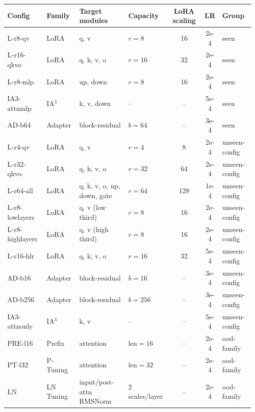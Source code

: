 \begin{table}[t]
\centering
\small
\setlength{\tabcolsep}{4pt}
\begin{tabular}{@{}llllccl@{}}
\toprule
Config & Family & Target modules & Capacity & LoRA scaling & LR & Group \\
\midrule
L-r8-qv        & LoRA      & q, v                       & $r{=}8$   & 16  & 2e-4 & seen \\
L-r16-qkvo     & LoRA      & q, k, v, o                 & $r{=}16$  & 32  & 2e-4 & seen \\
L-r8-mlp       & LoRA      & up, down                   & $r{=}8$   & 16  & 2e-4 & seen \\
IA3-attnmlp    & IA$^3$    & k, v, down                 & --        & --  & 5e-4 & seen \\
AD-b64         & Adapter   & block-residual             & $b{=}64$  & --  & 3e-4 & seen \\
\midrule
L-r4-qv        & LoRA      & q, v                       & $r{=}4$   & 8   & 2e-4 & unseen-config \\
L-r32-qkvo     & LoRA      & q, k, v, o                 & $r{=}32$  & 64  & 2e-4 & unseen-config \\
L-r64-all      & LoRA      & q, k, v, o, up, down, gate & $r{=}64$  & 128 & 1e-4 & unseen-config \\
L-r8-lowlayers & LoRA      & q, v (low third)           & $r{=}8$   & 16  & 2e-4 & unseen-config \\
L-r8-highlayers& LoRA      & q, v (high third)          & $r{=}8$   & 16  & 2e-4 & unseen-config \\
L-r16-hlr      & LoRA      & q, k, v, o                 & $r{=}16$  & 32  & 5e-4 & unseen-config \\
AD-b16         & Adapter   & block-residual             & $b{=}16$  & --  & 3e-4 & unseen-config \\
AD-b256        & Adapter   & block-residual             & $b{=}256$ & --  & 3e-4 & unseen-config \\
IA3-attnonly   & IA$^3$    & k, v                       & --        & --  & 5e-4 & unseen-config \\
\midrule
PRE-l16        & Prefix    & attention                  & len${=}16$& --  & 2e-4 & ood-family \\
PT-l32         & P-Tuning  & attention                  & len${=}32$& --  & 2e-4 & ood-family \\
LN             & LN Tuning & input/post-attn RMSNorm    & 2 scales/layer & -- & 2e-4 & ood-family \\

\end{tabular}
\end{table}
